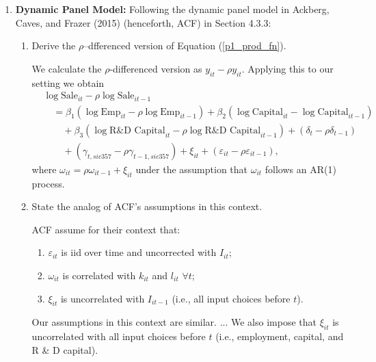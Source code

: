 \documentclass{article}
\begin{document}
\begin{enumerate}
\item \textbf{Dynamic Panel Model:}
Following the dynamic panel model in Ackberg, Caves, and Frazer (2015) (henceforth, ACF) in Section 4.3.3:

\begin{enumerate}
\item Derive the $\rho$–dfferenced version of Equation (\ref{p1_prod_fn}).

\begin{answer}

We calculate the $\rho$-differenced version as $y_{it} - \rho y_{it}$. Applying this to our setting we obtain 
\begin{align*}
    &\log \text{Sale}_{it} - \rho  \log \text{Sale}_{it-1} \\ 
    &\quad = \beta_1 (\log \text{Emp}_{it} - \rho \log \text{Emp}_{it-1}) + \beta_2 (\log \text{Capital}_{it} - \log \text{Capital}_{it-1}) \\ 
    &\quad \quad + \beta_3 (\log \text{R\&D Capital}_{it}  - \rho \log \text{R\&D Capital}_{it-1}) 
    + (\delta_t - \rho \delta_{t-1}) \\ 
    &\quad\quad + (\gamma_{t, sic357} - \rho \gamma_{t-1, sic357}) + \xi_{it} + (\varepsilon_{it}-\rho\varepsilon_{it-1}),
\end{align*}
where $\omega_{it} = \rho \omega_{it-1} + \xi_{it}$ under the assumption that $\omega_{it}$ follows an AR(1) process. 


\end{answer}



\item State the analog of ACF’s assumptions in this context. 

\begin{answer}

ACF assume for their context that: 
\begin{enumerate}
    \item $\varepsilon_{it}$ is iid over time and uncorrected with $I_{it}$; 
    \item $\omega_{it}$ is correlated with $k_{it}$ and $l_{it}$ $\forall t$; 
    \item $\xi_{it}$ is uncorrelated with $I_{it-1}$ (i.e., all input choices before $t$). 
\end{enumerate}

Our assumptions in this context are similar. ...  We also impose that $\xi_{it}$ is uncorrelated with all input choices before $t$ (i.e., employment, capital, and R \& D capital).


\end{answer}
\end{enumerate}
\end{enumerate}
\end{document}
